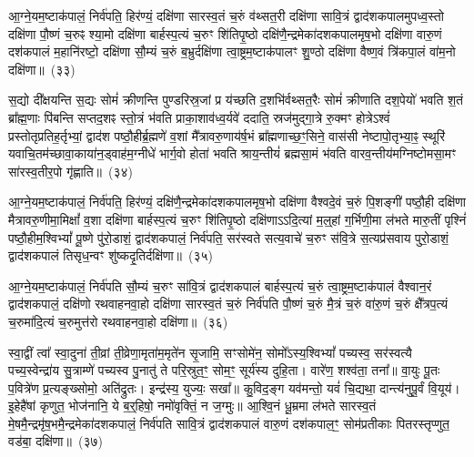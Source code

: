 {\anuvakamend[{स॒त्यौजा᳚श्चत्वारि॒ꣳ॒शच्च॑}]}%

आ॒ग्ने॒यम॒ष्टा\-क॑पालं॒ निर्व॑पति॒ हिर॑ण्यं॒ दक्षि॑णा सारस्व॒तं च॒रुं व॑थ्सत॒री दक्षि॑णा सावि॒त्रं द्वाद॑श\-कपालमुपध्व॒स्तो दक्षि॑णा पौ॒ष्णं च॒रुꣴ श्या॒मो दक्षि॑णा बार्\mbox{}हस्प॒त्यं च॒रुꣳ शि॑तिपृ॒ष्ठो दक्षि॑णै॒न्द्रमेका॑\-दश\-कपालमृष॒भो दक्षि॑णा वारु॒णं दश॑\-कपालं म॒हानि॑रष्टो॒ दक्षि॑णा सौ॒म्यं च॒रुं ब॒भ्रुर्दक्षि॑णा त्वा॒ष्ट्रम॒ष्टाक॑पालꣳ शु॒ण्ठो दक्षि॑णा वैष्ण॒वं त्रि॑कपा॒लं वा॑म॒नो दक्षि॑णा॥~(३३)

{\anuvakamend[{आ॒ग्ने॒यं द्विच॑त्वारिꣳशत्}]}%

स॒द्यो दी᳚क्षयन्ति स॒द्यः सोमं॑ क्रीणन्ति पुण्डरिस्र॒जां प्र य॑च्छति द॒शभि॑र्वथ्सत॒रैः सोमं॑ क्रीणाति दश॒पेयो॑ भवति श॒तं ब्रा᳚ह्म॒णाः पि॑बन्ति सप्तद॒शꣴ स्तो॒त्रं भ॑वति प्राका॒शाव॑ध्व॒र्यवे॑ ददाति॒ स्रज॑मुद्गा॒त्रे रु॒क्मꣳ होत्रे\-ऽश्वं॑ प्रस्तोतृप्रतिह॒र्तृभ्यां॒ द्वाद॑श पष्ठौ॒हीर्ब्र॒ह्मणे॑ व॒शां मै᳚त्रावरु॒णाय॑र्\mbox{}ष॒भं ब्रा᳚ह्मणाच्छ॒ꣳ॒सिने॒ वास॑सी नेष्टापो॒तृभ्या॒ꣴ॒ स्थूरि॑ यवाचि॒तम॑च्छावा॒काया॑न॒ड्वाह॑म॒ग्नीधे॑ भार्ग॒वो होता॑ भवति श्राय॒न्तीयं॑ ब्रह्मसा॒मं भ॑वति वारव॒न्तीय॑मग्निष्टोमसा॒मꣳ सा॑रस्व॒तीर॒पो गृ॑ह्णाति॥~(३४)

{\anuvakamend[{वा॒र॒व॒न्तीयं॑ च॒त्वारि॑ च}]}%

आ॒ग्ने॒यम॒ष्टा\-क॑पालं॒ निर्व॑पति॒ हिर॑ण्यं॒ दक्षि॑णै॒न्द्रमेका॑\-दश\-कपालमृष॒भो दक्षि॑णा वैश्वदे॒वं च॒रुं पि॒शङ्गी॑ पष्ठौ॒ही दक्षि॑णा मैत्रावरु॒णीमा॒मिक्षां᳚ व॒शा दक्षि॑णा बार्\mbox{}हस्प॒त्यं च॒रुꣳ शि॑तिपृ॒ष्ठो दक्षि॑णा\-ऽ\-ऽदि॒त्यां म॒ल्॒\mbox{}हां ग॒र्भिणी॒मा ल॑भते मारु॒तीं पृश्निं॑ पष्ठौ॒हीम॒श्वि\-भ्यां᳚ पू॒ष्णे पु॑रो॒डाशं॒ द्वाद॑श\-कपालं॒ निर्व॑पति॒ सर॑स्वते सत्य॒वाचे॑ च॒रुꣳ स॑वि॒त्रे स॒त्यप्र॑सवाय पुरो॒डाशं॒ द्वाद॑श\-कपालं तिसृध॒न्वꣳ शु॑ष्कदृ॒तिर्दक्षि॑णा॥~(३५)

{\anuvakamend[{आ॒ग्ने॒यꣳ स॒प्तच॑त्वारिꣳशत्}]}%

आ॒ग्ने॒यम॒ष्टा\-क॑पालं॒ निर्व॑पति सौ॒म्यं च॒रुꣳ सा॑वि॒त्रं द्वाद॑श\-कपालं बार्\mbox{}हस्प॒त्यं च॒रुं त्वा॒ष्ट्रम॒ष्टाक॑पालं वैश्वान॒रं द्वाद॑श\-कपालं॒ दक्षि॑णो रथवाहनवा॒हो दक्षि॑णा सारस्व॒तं च॒रुं निर्व॑पति पौ॒ष्णं च॒रुं मै॒त्रं च॒रुं वा॑रु॒णं च॒रुं क्षै᳚त्रप॒त्यं च॒रुमा॑दि॒त्यं च॒रुमुत्त॑रो रथवाहनवा॒हो दक्षि॑णा॥~(३६)

{\anuvakamend[{आ॒ग्ने॒यं चतु॑स्त्रिꣳशत्}]}%

स्वा॒द्वीं त्वा᳚ स्वा॒दुना॑ ती॒व्रां ती॒व्रेणा॒मृता॑म॒मृते॑न सृ॒जामि॒ सꣳसोमे॑न॒ सोमो᳚\-ऽस्य॒श्वि\-भ्यां᳚ पच्यस्व॒ सर॑स्वत्यै पच्य॒स्वेन्द्रा॑य सु॒त्राम्णे॑ पच्यस्व पु॒नातु॑ ते परि॒स्रुत॒ꣳ॒ सोम॒ꣳ॒ सूर्य॑स्य दुहि॒ता। वारे॑ण॒ शश्व॑ता॒ तना᳚॥ वा॒युः पू॒तः प॒वित्रे॑ण प्र॒त्यङ्ख्सोमो॒ अति॑द्रुतः। इन्द्र॑स्य॒ युज्यः॒ सखा᳚॥ कु॒विद॒ङ्ग यव॑मन्तो॒ यवं॑ चि॒द्यथा॒ दान्त्य॑नुपू॒र्वं वि॒यूय॑। इ॒हेहै॑षां कृणुत॒ भोज॑नानि॒ ये ब॒र्॒\mbox{}हिषो॒ नमो॑वृक्तिं॒ न ज॒ग्मुः॥ आ॒श्वि॒नं धू॒म्रमा ल॑भते सारस्व॒तं मे॒षमै॒न्द्रमृ॑ष॒भमै॒न्द्रमेका॑\-दश\-कपालं॒ निर्व॑पति सावि॒त्रं द्वाद॑श\-कपालं वारु॒णं दश॑\-कपाल॒ꣳ॒ सोम॑प्रतीकाः पितरस्तृप्णुत॒ वड॑बा॒ दक्षि॑णा॥~(३७)

